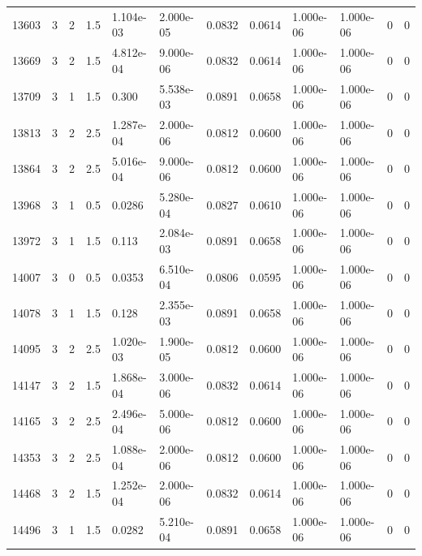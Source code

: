 \documentclass[preview]{standalone}
\begin{document}
{{{{{\begin{tabular}{L{1.2cm}C{1.2cm} C{0.3cm}C{0.5cm} C{1.4cm}C{1.4cm} C{1.4cm}C{1.4cm} C{1.6cm}C{1.6cm} C{1.6cm}C{1.6cm}}
  13603  &     3  & 2     & 1.5 &  1.104e-03  & 2.000e-05  &  0.0832&   0.0614& 1.000e-06 & 1.000e-06   &  0 & 0  \\ 
  13669  &     3  & 2     & 1.5 &  4.812e-04  & 9.000e-06  &  0.0832&   0.0614& 1.000e-06 & 1.000e-06   &  0 & 0  \\ 
  13709  &     3  & 1     & 1.5 &  0.300  & 5.538e-03  &  0.0891&   0.0658& 1.000e-06 & 1.000e-06   &  0 & 0  \\ 
  13813  &     3  & 2     & 2.5 &  1.287e-04  & 2.000e-06  &  0.0812&   0.0600& 1.000e-06 & 1.000e-06   &  0 & 0  \\ 
  13864  &     3  & 2     & 2.5 &  5.016e-04  & 9.000e-06  &  0.0812&   0.0600& 1.000e-06 & 1.000e-06   &  0 & 0  \\ 
  13968  &     3  & 1     & 0.5 &  0.0286  & 5.280e-04  &  0.0827&   0.0610& 1.000e-06 & 1.000e-06   &  0 & 0  \\ 
  13972  &     3  & 1     & 1.5 &  0.113  & 2.084e-03  &  0.0891&   0.0658& 1.000e-06 & 1.000e-06   &  0 & 0  \\ 
  14007  &     3  & 0     & 0.5 &  0.0353  & 6.510e-04  &  0.0806&   0.0595& 1.000e-06 & 1.000e-06   &  0 & 0  \\ 
  14078  &     3  & 1     & 1.5 &  0.128  & 2.355e-03  &  0.0891&   0.0658& 1.000e-06 & 1.000e-06   &  0 & 0  \\ 
  14095  &     3  & 2     & 2.5 &  1.020e-03  & 1.900e-05  &  0.0812&   0.0600& 1.000e-06 & 1.000e-06   &  0 & 0  \\ 
  14147  &     3  & 2     & 1.5 &  1.868e-04  & 3.000e-06  &  0.0832&   0.0614& 1.000e-06 & 1.000e-06   &  0 & 0  \\ 
  14165  &     3  & 2     & 2.5 &  2.496e-04  & 5.000e-06  &  0.0812&   0.0600& 1.000e-06 & 1.000e-06   &  0 & 0  \\ 
  14353  &     3  & 2     & 2.5 &  1.088e-04  & 2.000e-06  &  0.0812&   0.0600& 1.000e-06 & 1.000e-06   &  0 & 0  \\ 
  14468  &     3  & 2     & 1.5 &  1.252e-04  & 2.000e-06  &  0.0832&   0.0614& 1.000e-06 & 1.000e-06   &  0 & 0  \\ 
  14496  &     3  & 1     & 1.5 &  0.0282  & 5.210e-04  &  0.0891&   0.0658& 1.000e-06 & 1.000e-06   &  0 & 0  \\ 
\hline 
\end{tabular} 

}}}}}
\end{document}

